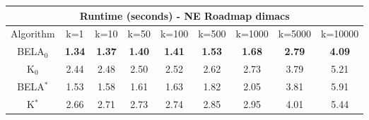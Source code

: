 \begin{tabular}{c|cccccccc}\toprule
\multicolumn{9}{c}{Runtime (seconds) - NE Roadmap dimacs}\\ \midrule
Algorithm & k=1 & k=10 & k=50 & k=100 & k=500 & k=1000 & k=5000 & k=10000 \\ \midrule
BELA$_0$ & \textbf{1.34} & \textbf{1.37} & \textbf{1.40} & \textbf{1.41} & \textbf{1.53} & \textbf{1.68} & \textbf{2.79} & \textbf{4.09} \\
K$_0$ & 2.44 & 2.48 & 2.50 & 2.52 & 2.62 & 2.73 & 3.79 & 5.21 \\
BELA$^*$ & 1.53 & 1.58 & 1.61 & 1.63 & 1.82 & 2.05 & 3.81 & 5.91 \\
K$^*$ & 2.66 & 2.71 & 2.73 & 2.74 & 2.85 & 2.95 & 4.01 & 5.44 \\ \bottomrule 
\end{tabular}
